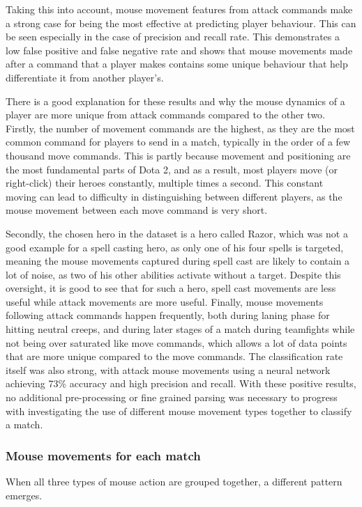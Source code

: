 \documentclass[Report.tex]{subfiles}
\begin{document}
Taking this into account, mouse movement features from attack commands make a strong case for being the most effective at predicting player behaviour. This can be seen especially in the case of precision and recall rate. This demonstrates a low false positive and false negative rate and shows that mouse movements made after a command that a player makes contains some unique behaviour that help differentiate it from another player's. 

There is a good explanation for these results and why the mouse dynamics of a player are more unique from attack commands compared to the other two. Firstly, the number of movement commands are the highest, as they are the most common command for players to send in a match, typically in the order of a few thousand move commands. This is partly because movement and positioning are the most fundamental parts of Dota 2, and as a result, most players move (or right-click) their heroes constantly, multiple times a second. This constant moving can lead to difficulty in distinguishing between different players, as the mouse movement between each move command is very short. 

Secondly, the chosen hero in the dataset is a hero called Razor, which was not a good example for a spell casting hero, as only one of his four spells is targeted, meaning the mouse movements captured during spell cast are likely to contain a lot of noise, as two of his other abilities activate without a target. Despite this oversight, it is good to see that for such a hero, spell cast movements are less useful while attack movements are more useful. Finally, mouse movements following attack commands happen frequently, both during laning phase for hitting neutral creeps, and during later stages of a match during teamfights while not being over saturated like move commands, which allows a lot of data points that are more unique compared to the move commands. The classification rate itself was also strong, with attack mouse movements using a neural network achieving 73\% accuracy and high precision and recall. With these positive results, no additional pre-processing or fine grained parsing was necessary to progress with investigating the use of different mouse movement types together to classify a match.


\subsubsection{Mouse movements for each match}\label{sbsec:game-classification}
When all three types of mouse action are grouped together, a different pattern emerges. 
\end{document}
